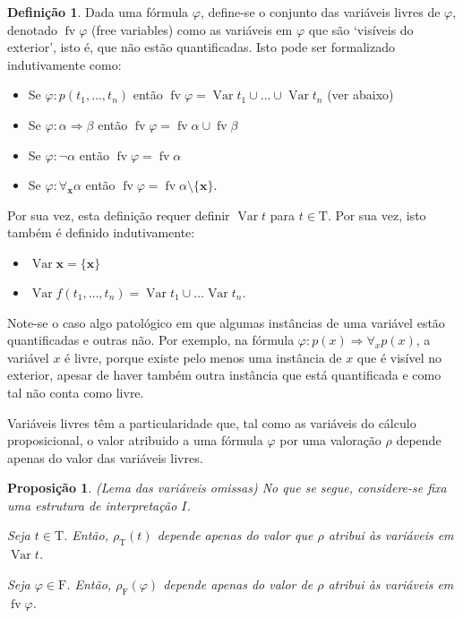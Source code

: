 \documentclass{report}
\newtheorem{prop}{Proposição}
\theoremstyle{definition}
\newtheorem{definicao}{Definição}
\theoremstyle{remark}
\renewcommand{\bf}[1]{\mathbf{#1}}
\newcommand{\F}{\mathrm{F}}
\newcommand{\T}{\mathrm{T}}
\DeclareMathOperator{\var}{Var}
\DeclareMathOperator{\fv}{fv}
\newcommand{\imply}{\mathbin{\Rightarrow}}
\begin{document}
	\begin{definicao}
	Dada uma fórmula $\varphi$, define-se o conjunto das variáveis livres de $\varphi$, denotado $\fv \varphi$ (free variables) como as variáveis em $\varphi$ que são `visíveis do exterior', isto é, que não estão quantificadas. Isto pode ser formalizado indutivamente como:
	
	\begin{itemize}
	\item Se $\varphi : p(t_1,\dots,t_n)$ então $\fv \varphi = \var t_1 \cup \dots \cup \var t_n$ (ver abaixo)
	
	\item Se $\varphi : \alpha \imply \beta$ então $\fv \varphi = \fv \alpha \cup \fv \beta$
	
	\item Se $\varphi : \neg \alpha$ então $\fv \varphi = \fv \alpha$
	
	\item Se $\varphi : \forall_{\bf x} \alpha$ então $\fv \varphi = \fv \alpha \setminus \{\bf x\}$.
	\end{itemize}
	
	Por sua vez, esta definição requer definir $\var t$ para $t \in \T$. Por sua vez, isto também é definido indutivamente:
	
	\begin{itemize}
	\item $\var \bf x = \{\bf x\}$
	
	\item $\var f(t_1, \dots, t_n) = \var t_1 \cup \dots \var t_n$.
	\end{itemize}
	\end{definicao}
	
	Note-se o caso algo patológico em que algumas instâncias de uma variável estão quantificadas e outras não. Por exemplo, na fórmula $\varphi : p(x) \imply \forall_x p(x)$, a variável $x$ é livre, porque existe pelo menos uma instância de $x$ que é visível no exterior, apesar de haver também outra instância que está quantificada e como tal não conta como livre.
	
	Variáveis livres têm a particularidade que, tal como as variáveis do cálculo proposicional, o valor atribuido a uma fórmula $\varphi$ por uma valoração $\rho$ depende apenas do valor das variáveis livres.
	
	\begin{prop} (Lema das variáveis omissas) No que se segue, considere-se fixa uma estrutura de interpretação $I$.
	
	Seja $t \in \T$. Então, $\rho_\T(t)$ depende apenas do valor que $\rho$ atribui às variáveis em $\var t$.
	
	Seja $\varphi \in \F$. Então, $\rho_\F(\varphi)$ depende apenas do valor de $\rho$ atribui às variáveis em $\fv \varphi$.
	\end{prop}
	
\end{document}
